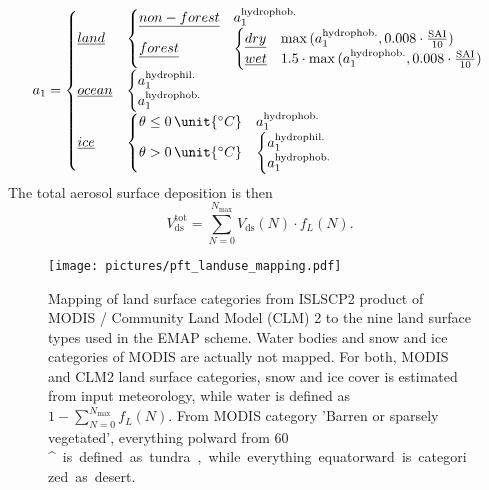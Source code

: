 \documentclass[gmd, manuscript]{copernicus}
\begin{document}
\begin{equation}
  a_1 =
  \begin{cases}
    \emph{land} &
    \begin{cases}
      \emph{non-forest} &  a_1^\text{hydrophob.}\\
      \emph{forest} &
      \begin{cases}
        \emph{dry} & \max{(a_1^\text{hydrophob.}, 0.008\cdot\frac{\text{SAI}}{10})}\\
        \emph{wet} & 1.5\cdot\max{(a_1^\text{hydrophob.}, 0.008\cdot\frac{\text{SAI}}{10})}\\
    \end{cases}\\
    \end{cases}\\
    \emph{ocean} &
    \begin{cases}
      a_1^\text{hydrophil.}\\
      a_1^\text{hydrophob.}\\
    \end{cases}\\
    \emph{ice} &
    \begin{cases}
      \theta \le 0\,\unit{^\circ C} & a_1^\text{hydrophob.}\\
      \theta > 0\,\unit{^\circ C} &
      \begin{cases}
        a_1^\text{hydrophil.}\\
        a_1^\text{hydrophob.}\\
      \end{cases}\\
    \end{cases}\\
  \end{cases}
  \label{eq:dd_aerosol_a1}
\end{equation}
%
The total aerosol surface deposition is then
\begin{equation}
 V_\text{ds}^\text{tot} = \sum_{N=0}^{N_\text{max}} V_\text{ds}(N) \cdot f_L(N).
\end{equation}
%
\begin{figure*}[t]
  \texttt{[image: pictures/pft\_landuse\_mapping.pdf]}
  \caption{Mapping of land surface categories from ISLSCP2 product of MODIS /  Community Land Model (CLM) 2 to the nine land surface types used in the EMAP scheme. Water bodies and snow and ice categories of MODIS are actually not mapped. For both, MODIS and CLM2 land surface categories, snow and ice cover is estimated from input meteorology, while water is defined as $1-\sum_{N=0}^{N_\text{max}} f_L(N)$. From MODIS category 'Barren or sparsely vegetated', everything polward from 60\,\unit{^\circ} is defined as tundra, while everything equatorward is categorized as desert.}
  \label{fig:pft_mapping}
\end{figure*}
%
\end{document}
